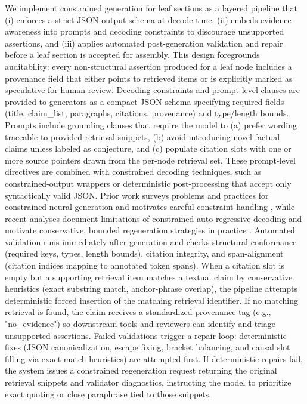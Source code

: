 We implement constrained generation for leaf sections as a layered pipeline that (i) enforces a strict JSON output schema at decode time, (ii) embeds evidence-awareness into prompts and decoding constraints to discourage unsupported assertions, and (iii) applies automated post-generation validation and repair before a leaf section is accepted for assembly.
This design foregrounds auditability: every non-structural assertion produced for a leaf node includes a provenance field that either points to retrieved items or is explicitly marked as speculative for human review.
Decoding constraints and prompt-level clauses are provided to generators as a compact JSON schema specifying required fields (title, claim_list, paragraphs, citations, provenance) and type/length bounds.
Prompts include grounding clauses that require the model to (a) prefer wording traceable to provided retrieval snippets, (b) avoid introducing novel factual claims unless labeled as conjecture, and (c) populate citation slots with one or more source pointers drawn from the per-node retrieval set.
These prompt-level directives are combined with constrained decoding techniques, such as constrained-output wrappers or deterministic post-processing that accept only syntactically valid JSON.
Prior work surveys problems and practices for constrained neural generation and motivates careful constraint handling \cite{web_garbacea_2022_why_is_constrained_neural_language_generation_pa},
while recent analyses document limitations of constrained auto-regressive decoding and motivate conservative, bounded regeneration strategies in practice \cite{web_wu_2025_constrained_auto_regressive_decoding_constrains_}.
Automated validation runs immediately after generation and checks structural conformance (required keys, types, length bounds), citation integrity, and span-alignment (citation indices mapping to annotated token spans).
When a citation slot is empty but a supporting retrieval item matches a textual claim by conservative heuristics (exact substring match, anchor-phrase overlap), the pipeline attempts deterministic forced insertion of the matching retrieval identifier.
If no matching retrieval is found, the claim receives a standardized provenance tag (e.g., "no_evidence") so downstream tools and reviewers can identify and triage unsupported assertions.
Failed validations trigger a repair loop: deterministic fixes (JSON canonicalization, escape fixing, bracket balancing, and causal slot filling via exact-match heuristics) are attempted first.
If deterministic repairs fail, the system issues a constrained regeneration request returning the original retrieval snippets and validator diagnostics, instructing the model to prioritize exact quoting or close paraphrase tied to those snippets.
